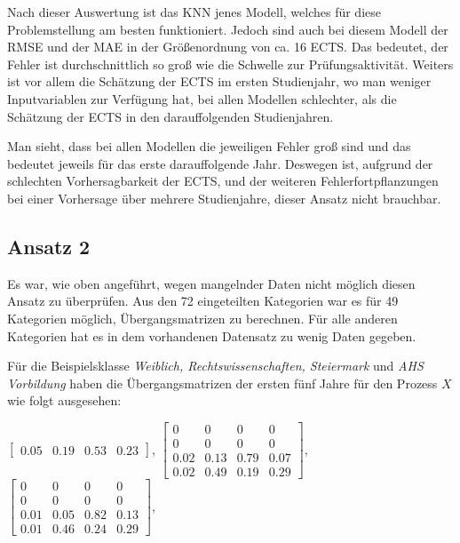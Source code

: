 Nach dieser Auswertung ist das KNN jenes Modell, welches f\"ur diese Problemstellung am besten funktioniert. Jedoch sind auch bei diesem Modell der
RMSE und der MAE in der Gr\"o{\ss}enordnung von ca. 16 ECTS. Das bedeutet, der Fehler ist durchschnittlich so gro{\ss} wie die Schwelle zur Pr\"ufungsaktivit\"at.
Weiters ist vor allem die Sch\"atzung der ECTS im ersten Studienjahr, wo man weniger Inputvariablen zur Verf\"ugung hat, bei allen Modellen schlechter, als die
Sch\"atzung der ECTS in den darauffolgenden Studienjahren.

Man sieht, dass bei allen Modellen die jeweiligen Fehler gro{\ss} sind und das bedeutet jeweils f\"ur das erste darauffolgende Jahr.
Deswegen ist, aufgrund der schlechten Vorhersagbarkeit der ECTS, und der weiteren Fehlerfortpflanzungen bei einer Vorhersage \"uber mehrere Studienjahre,
dieser Ansatz nicht brauchbar.










\subsection{Ansatz 2}
Es war, wie oben angef\"uhrt, wegen mangelnder Daten nicht m\"oglich diesen Ansatz zu \"uberpr\"ufen.
Aus den 72 eingeteilten Kategorien war es f\"ur 49 Kategorien m\"oglich, \"Ubergangsmatrizen zu berechnen. F\"ur alle anderen
Kategorien hat es in dem vorhandenen Datensatz zu wenig Daten gegeben.

F\"ur die Beispielsklasse \textit{Weiblich, Rechtswissenschaften, Steiermark} und  \textit{AHS Vorbildung} haben die \"Ubergangsmatrizen der ersten fünf Jahre f\"ur den Prozess $X$ wie folgt ausgesehen:

$\left[ \begin{array}{rrrr}  0.05 & 0.19 & 0.53 & 0.23  \end{array}\right]$, $\left[ \begin{array}{rrrr} 0 & 0 & 0 & 0 \\  0 & 0 & 0 & 0 \\ 0.02 & 0.13 & 0.79 & 0.07 \\ 0.02 & 0.49 & 0.19 & 0.29 \end{array}\right]$,
$\left[ \begin{array}{rrrr} 0 & 0 & 0 & 0 \\  0 & 0 & 0 & 0 \\ 0.01 & 0.05  & 0.82  & 0.13 \\ 0.01 & 0.46 & 0.24 & 0.29 \end{array}\right]$, \\

